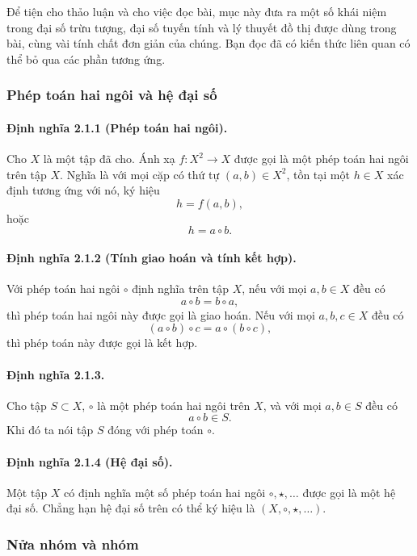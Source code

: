 \documentclass[11pt]{article}
\begin{document}
Để tiện cho thảo luận và cho việc đọc bài, mục này đưa ra một số khái niệm trong
đại số trừu tượng, đại số tuyến tính và lý thuyết đồ thị được dùng trong bài,
cùng vài tính chất đơn giản của chúng. Bạn đọc đã có kiến thức liên quan có thể
bỏ qua các phần tương ứng.

\subsubsection{Phép toán hai ngôi và hệ đại số}

\paragraph{Định nghĩa 2.1.1 (Phép toán hai ngôi).}
Cho \(X\) là một tập đã cho. Ánh xạ \(f:X^2\to X\) được gọi là một phép toán hai
ngôi trên tập \(X\). Nghĩa là với mọi cặp có thứ tự \((a,b)\in X^2\), tồn tại
một \(h\in X\) xác định tương ứng với nó, ký hiệu
\[
  h=f(a,b),
\]
hoặc
\[
  h=a\circ b.
\]

\paragraph{Định nghĩa 2.1.2 (Tính giao hoán và tính kết hợp).}
Với phép toán hai ngôi \(\circ\) định nghĩa trên tập \(X\), nếu với mọi
\(a,b\in X\) đều có
\[
  a\circ b=b\circ a,
\]
thì phép toán hai ngôi này được gọi là giao hoán. Nếu với mọi \(a,b,c\in X\) đều
có
\[
  (a\circ b)\circ c=a\circ(b\circ c),
\]
thì phép toán này được gọi là kết hợp.

\paragraph{Định nghĩa 2.1.3.}
Cho tập \(S\subset X\), \(\circ\) là một phép toán hai ngôi trên \(X\), và với
mọi \(a,b\in S\) đều có
\[
  a\circ b\in S.
\]
Khi đó ta nói tập \(S\) đóng với phép toán \(\circ\).

\paragraph{Định nghĩa 2.1.4 (Hệ đại số).}
Một tập \(X\) có định nghĩa một số phép toán hai ngôi
\(\circ,\star,\ldots\) được gọi là một hệ đại số. Chẳng hạn hệ đại số trên có
thể ký hiệu là \((X,\circ,\star,\ldots)\).

\subsubsection{Nửa nhóm và nhóm}
\end{document}

